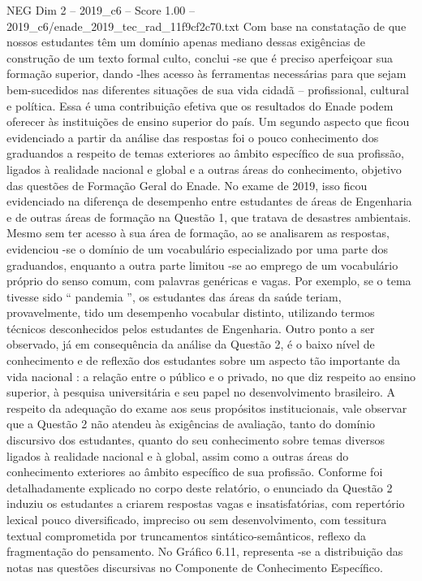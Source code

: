 \begin{textsample}{NEG Dim 2 – 2019\_c6 – Score 1.00 – 2019\_c6/enade\_2019\_tec\_rad\_11f9cf2c70.txt}
Com base na constatação de que nossos estudantes têm um domínio apenas mediano dessas exigências de construção de um texto formal culto, conclui -se que é preciso aperfeiçoar sua formação superior, dando -lhes acesso às ferramentas necessárias para que sejam bem-sucedidos nas diferentes situações de sua vida cidadã – profissional, cultural e política.
Essa é uma contribuição efetiva que os resultados do Enade podem oferecer às instituições de ensino superior do país.
Um segundo aspecto que ficou evidenciado a partir da análise das respostas foi o pouco conhecimento dos graduandos a respeito de temas exteriores ao âmbito específico de sua profissão, ligados à realidade nacional e global e a outras áreas do conhecimento, objetivo das questões de Formação Geral do Enade.
No exame de 2019, isso ficou evidenciado na diferença de desempenho entre estudantes de áreas de Engenharia e de outras áreas de formação na Questão 1, que tratava de desastres ambientais.
Mesmo sem ter acesso à sua área de formação, ao se analisarem as respostas, evidenciou -se o domínio de um vocabulário especializado por uma parte dos graduandos, enquanto a outra parte limitou -se ao emprego de um vocabulário próprio do senso comum, com palavras genéricas e vagas.
Por exemplo, se o tema tivesse sido “ pandemia ”, os estudantes das áreas da saúde teriam, provavelmente, tido um desempenho vocabular distinto, utilizando termos técnicos desconhecidos pelos estudantes de Engenharia.
Outro ponto a ser observado, já em consequência da análise da Questão 2, é o baixo nível de conhecimento e de reflexão dos estudantes sobre um aspecto tão importante da vida nacional : a relação entre o público e o privado, no que diz respeito ao ensino superior, à pesquisa universitária e seu papel no desenvolvimento brasileiro.
A respeito da adequação do exame aos seus propósitos institucionais, vale observar que a Questão 2 não atendeu às exigências de avaliação, tanto do domínio discursivo dos estudantes, quanto do seu conhecimento sobre temas diversos ligados à realidade nacional e à global, assim como a outras áreas do conhecimento exteriores ao âmbito específico de sua profissão.
Conforme foi detalhadamente explicado no corpo deste relatório, o enunciado da Questão 2 induziu os estudantes a criarem respostas vagas e insatisfatórias, com repertório lexical pouco diversificado, impreciso ou sem desenvolvimento, com tessitura textual comprometida por truncamentos sintático-semânticos, reflexo da fragmentação do pensamento.
No Gráfico 6.11, representa -se a distribuição das notas nas questões discursivas no Componente de Conhecimento Específico.

\end{textsample}
